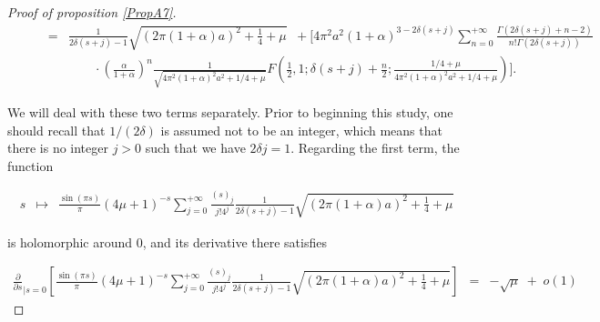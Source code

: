 \documentclass{jams-l}
\theoremstyle{definition}
\theoremstyle{remark}
\numberwithin{equation}{section}
\begin{document}
\begin{proof}[Proof of proposition \ref{PropA7}]
\[\begin{array}{lll}
                        \qquad & = & \scriptstyle \frac{1}{2 \delta \left( s + j \right) - 1} \sqrt{\left( 2 \pi \left( 1 + \alpha \right) a \right)^2 + \frac{1}{4} + \mu} \; \; + \big[ 4 \pi^2 a^2 \left( 1 + \alpha \right)^{3 - 2 \delta \left( s + j \right)} \sum\limits_{n = 0}^{+ \infty} \frac{\Gamma \left( 2 \delta \left( s + j \right) + n - 2 \right)}{n! \Gamma \left( 2 \delta \left( s + j \right) \right)} \\[0.5em]
                        
                        && \qquad \scriptstyle \cdot \left( \frac{\alpha}{1 + \alpha} \right)^n \frac{1}{\sqrt{4 \pi^2 \left( 1 + \alpha \right)^2 a^2 + 1/4 + \mu}} F \left( \frac{1}{2}, 1; \delta \left( s + j \right) + \frac{n}{2}; \frac{1/4 + \mu}{4 \pi^2 \left( 1 + \alpha \right)^2 a^2 + 1/4 + \mu} \right) \big].
                    \end{array} \]
                
                \noindent We will deal with these two terms separately. Prior to beginning this study, one should recall that $1/\left( 2 \delta \right)$ is assumed not to be an integer, which means that there is no integer $j > 0$ such that we have $2 \delta j = 1$. Regarding the first term, the function
                
                \[ \begin{array}{lll}
                        s & \longmapsto & \frac{\sin \left( \pi s \right)}{\pi} \left( 4 \mu + 1 \right)^{-s} \sum\limits_{j = 0}^{+ \infty} \frac{\left( s \right)_j}{j! 4^j} \frac{1}{2 \delta \left( s + j \right) - 1} \sqrt{\left( 2 \pi \left( 1 + \alpha \right) a \right)^2 + \frac{1}{4} + \mu}
                    \end{array} \]
                
                \noindent is holomorphic around $0$, and its derivative there satisfies
                
                \[ \begin{array}{lll}
                        \scriptstyle \frac{\partial}{\partial s}_{\left \vert s = 0 \right.} \left[ \frac{\sin \left( \pi s \right)}{\pi} \left( 4 \mu + 1 \right)^{-s} \sum\limits_{j = 0}^{+ \infty} \frac{\left( s \right)_j}{j! 4^j} \frac{1}{2 \delta \left( s + j \right) - 1} \sqrt{\left( 2 \pi \left( 1 + \alpha \right) a \right)^2 + \frac{1}{4} + \mu} \right] & \scriptstyle = & \scriptstyle - \sqrt{\mu} \; + \; o \left( 1 \right)
                    \end{array} \]
                

\end{proof}
\end{document}
